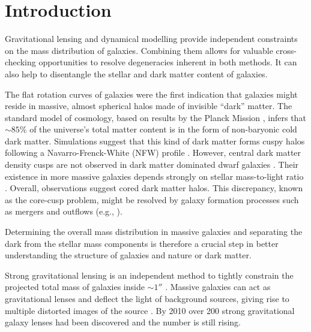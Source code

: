 \section{Introduction}

Gravitational lensing and dynamical modelling provide independent constraints on the mass distribution of galaxies. Combining them allows for valuable cross-checking opportunities to resolve degeneracies inherent in both methods. It can also help to disentangle the stellar and dark matter content of galaxies.

The flat rotation curves of galaxies \citep{1978ApJ...225L.107R} were the first indication that galaxies might reside in massive, almost spherical halos made of invisible ``dark'' matter. The standard model of cosmology, based on results by the Planck Mission \citep{WMAP5cosm} , infers that $\sim 85\%$ of the universe's total matter content is in the form of non-baryonic cold dark matter. Simulations suggest that this kind of dark matter forms cuspy halos following a Navarro-Frenck-White (NFW) profile \citep{NFW96}. However, central dark matter density cusps are not observed in dark matter dominated dwarf galaxies . Their existence in more massive galaxies depends strongly on stellar mass-to-light ratio . Overall, observations suggest cored dark matter halos. This discrepancy, known as the core-cusp problem, might be resolved by galaxy formation processes such as mergers and outflows (e.g., \citealt{2001ApJ...560..636E} ).

Determining the overall mass distribution in massive galaxies and separating the dark from the stellar mass components is therefore a crucial step in better understanding the structure of galaxies and nature or dark matter.

Strong gravitational lensing is an independent method to tightly constrain the projected total mass of galaxies inside $\sim 1''$ . Massive galaxies can act as gravitational lenses and deflect the light of background sources, giving rise to multiple distorted images of the source \Wilma{[TO DO: REF]}. By 2010 over 200 strong gravitational galaxy lenses had been discovered \citep{2010ARA&A..48...87T} and the number is still rising.

